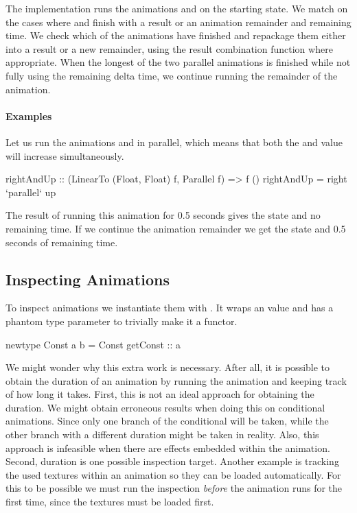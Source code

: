 The  implementation runs
the animations  and  on the starting
state. We match on the cases where  and
 finish with a result or an animation remainder and remaining
time. We check which of the animations have finished and repackage them
either into a result or a new remainder, using the result combination function
where appropriate. When the longest of the two parallel animations is finished
while not fully using the remaining delta time, we continue running the remainder
of the animation.

\paragraph{Examples}

Let us run the animations  and  in parallel, which means
that both the  and  value will increase simultaneously.

\begin{code}
rightAndUp :: (LinearTo (Float, Float) f, Parallel f) => f ()
rightAndUp = right `parallel` up
\end{code}

The result of running this animation for 0.5 seconds gives the state  and no remaining time. If we continue the animation
remainder we get the state  and 0.5 seconds of remaining 
time.

\subsection{Inspecting Animations}

To inspect animations we instantiate them with . It wraps an  value and has a  phantom type parameter to trivially make it a functor.

\begin{spec}
newtype Const a b = Const { getConst :: a }
\end{spec}

We might wonder why this extra work is necessary. After all, it is possible to obtain the duration of an animation by running the animation and keeping track of how long it takes. First, this is not an ideal approach for obtaining the duration. We might obtain erroneous results when doing this on conditional animations. Since only one branch of the conditional will be taken, while the other branch with a different duration might be taken in reality. Also, this approach is infeasible when there are effects embedded within the animation. Second, duration is one possible inspection target. Another example is tracking the used textures within an animation so they can be loaded automatically. For this to be possible we must run the inspection \emph{before} the animation runs for the first time, since the textures must be loaded first.

